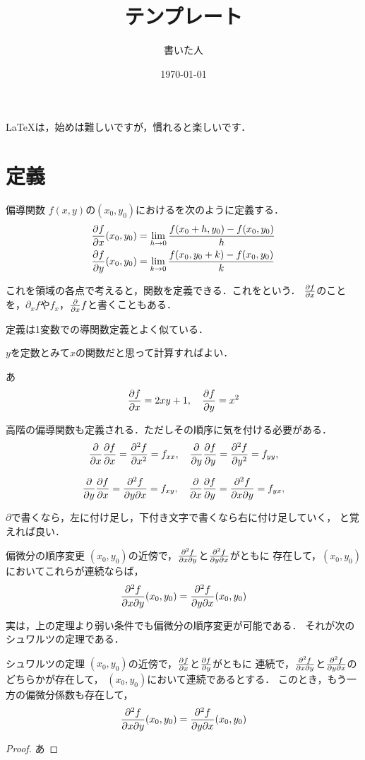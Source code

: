 \documentclass[dvipdfmx,a4j,11pt]{jsarticle}
\title{テンプレート}
\author{書いた人}
\date{\today}
\begin{document}
\maketitle


\LaTeX は，始めは難しいですが，慣れると楽しいです．

\section{定義}


\begin{dfn}{偏導関数}{}
   $f(x,y)$の$(x_0,y_0)$におけるを次のように定義する．
   \begin{align}
      \pdv{f}{x}\qty(x_0,y_0)&=\lim_{h\to 0}\frac{f(x_0+h,y_0)-f(x_0,y_0)}{h}\\
      \pdv{f}{y}\qty(x_0,y_0)&=\lim_{k\to 0}\frac{f(x_0,y_0+k)-f(x_0,y_0)}{k} 
   \end{align}
   
   これを領域の各点で考えると，関数を定義できる．これをという．
   $\pdv{f}{x}$のことを，$\partial_x f$や$f_x$，$\pdv{x}f$と書くこともある．
\end{dfn}

定義は1変数での導関数定義とよく似ている．

$y$を定数とみて$x$の関数だと思って計算すればよい．

\begin{ex}{}{}
あ
\[ \pdv{f}{x}=2xy+1, \ \  \ \pdv{f}{y}=x^2\]
\end{ex}



高階の偏導関数も定義される．ただしその順序に気を付ける必要がある．
\[ \pdv{x} \pdv{f}{x} =\pdv[2]{f}{x}=f_{xx},\ \ \
   \pdv{y} \pdv{f}{y} =\pdv[2]{f}{y}=f_{yy},\]

\[ \pdv{y} \pdv{f}{x} =\pdv{f}{y}{x}=f_{xy},\ \ \
   \pdv{x} \pdv{f}{y} =\pdv{f}{x}{y}=f_{yx},\]

$\partial$で書くなら，左に付け足し，下付き文字で書くなら右に付け足していく，
と覚えれば良い．


\begin{prop}{偏微分の順序変更}{}
   $(x_0,y_0)$の近傍で，$\pdv{f}{x}{y}$と$\pdv{f}{y}{x}$がともに
   存在して，$(x_0,y_0)$においてこれらが連続ならば，
   \[ \pdv{f}{x}{y} \qty(x_0,y_0)=\pdv{f}{y}{x} \qty(x_0,y_0) \]
\end{prop}

実は，上の定理より弱い条件でも偏微分の順序変更が可能である．
それが次のシュワルツの定理である．
\begin{thm}{シュワルツの定理}{}
   $(x_0,y_0)$の近傍で，$\pdv{f}{x}$と$\pdv{f}{y}$がともに
   連続で，$\pdv{f}{x}{y}$と$\pdv{f}{y}{x}$のどちらかが存在して，
   $(x_0,y_0)$において連続であるとする．
   このとき，もう一方の偏微分係数も存在して，
   \[ \pdv{f}{x}{y} \qty(x_0,y_0)=\pdv{f}{y}{x} \qty(x_0,y_0) \]
\end{thm}
\begin{proof}
   あ
\end{proof}
\end{document}
